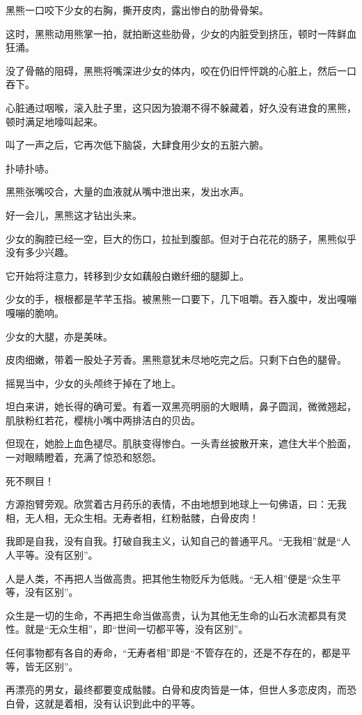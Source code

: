 \begin{this_body}
黑熊一口咬下少女的右胸，撕开皮肉，露出惨白的肋骨骨架。

这时，黑熊动用熊掌一拍，就拍断这些肋骨，少女的内脏受到挤压，顿时一阵鲜血狂涌。

没了骨骼的阻碍，黑熊将嘴深进少女的体内，咬在仍旧怦怦跳的心脏上，然后一口吞下。

心脏通过咽喉，滚入肚子里，这只因为狼潮不得不躲藏着，好久没有进食的黑熊，顿时满足地嚎叫起来。

叫了一声之后，它再次低下脑袋，大肆食用少女的五脏六腑。

扑哧扑哧。

黑熊张嘴咬合，大量的血液就从嘴中泄出来，发出水声。

好一会儿，黑熊这才钻出头来。

少女的胸腔已经一空，巨大的伤口，拉扯到腹部。但对于白花花的肠子，黑熊似乎没有多少兴趣。

它开始将注意力，转移到少女如藕般白嫩纤细的腿脚上。

少女的手，根根都是芊芊玉指。被黑熊一口要下，几下咀嚼。吞入腹中，发出嘎嘣嘎嘣的脆响。

少女的大腿，亦是美味。

皮肉细嫩，带着一股处子芳香。黑熊意犹未尽地吃完之后。只剩下白色的腿骨。

摇晃当中，少女的头颅终于掉在了地上。

坦白来讲，她长得的确可爱。有着一双黑亮明丽的大眼睛，鼻子圆润，微微翘起，肌肤粉红若花，樱桃小嘴中两排洁白的贝齿。

但现在，她脸上血色褪尽。肌肤变得惨白。一头青丝披散开来，遮住大半个脸面，一对眼睛瞪着，充满了惊恐和怒怨。

死不瞑目！

方源抱臂旁观。欣赏着古月药乐的表情，不由地想到地球上一句佛语，曰：无我相，无人相，无众生相。无寿者相，红粉骷髅，白骨皮肉！

我即是自我，没有自我。打破自我主义，认知自己的普通平凡。“无我相”就是“人人平等。没有区别”。

人是人类，不再把人当做高贵。把其他生物贬斥为低贱。“无人相”便是“众生平等，没有区别”。

众生是一切的生命，不再把生命当做高贵，认为其他无生命的山石水流都具有灵性。就是“无众生相”，即“世间一切都平等，没有区别”。

任何事物都有各自的寿命，“无寿者相”即是“不管存在的，还是不存在的，都是平等，皆无区别”。

再漂亮的男女，最终都要变成骷髅。白骨和皮肉皆是一体，但世人多恋皮肉，而恐白骨，这就是着相，没有认识到此中的平等。


\end{this_body}
